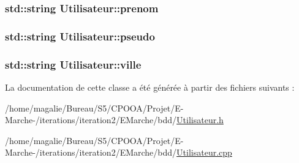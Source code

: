\hypertarget{class_utilisateur_a7cbd4b405cdff4fed665d74ddca1a61f}{
\subsubsection[{prenom}]{\setlength{\rightskip}{0pt plus 5cm}std\-::string Utilisateur\-::prenom\hspace{0.3cm}{\ttfamily [protected]}}}\label{class_utilisateur_a7cbd4b405cdff4fed665d74ddca1a61f}
\hypertarget{class_utilisateur_acefb31a3f7e204657236a73770e4b36c}{
\subsubsection[{pseudo}]{\setlength{\rightskip}{0pt plus 5cm}std\-::string Utilisateur\-::pseudo\hspace{0.3cm}{\ttfamily [protected]}}}\label{class_utilisateur_acefb31a3f7e204657236a73770e4b36c}
\hypertarget{class_utilisateur_ad5a26fdf60b16be6d077aecd582edaab}{
\subsubsection[{ville}]{\setlength{\rightskip}{0pt plus 5cm}std\-::string Utilisateur\-::ville\hspace{0.3cm}{\ttfamily [protected]}}}\label{class_utilisateur_ad5a26fdf60b16be6d077aecd582edaab}


La documentation de cette classe a été générée à partir des fichiers suivants \-:\begin{DoxyCompactItemize}
\item 
/home/magalie/\-Bureau/\-S5/\-C\-P\-O\-O\-A/\-Projet/\-E-\/\-Marche-\//iterations/iteration2/\-E\-Marche/bdd/\hyperlink{_utilisateur_8h}{Utilisateur.\-h}\item 
/home/magalie/\-Bureau/\-S5/\-C\-P\-O\-O\-A/\-Projet/\-E-\/\-Marche-\//iterations/iteration2/\-E\-Marche/bdd/\hyperlink{_utilisateur_8cpp}{Utilisateur.\-cpp}\end{DoxyCompactItemize}
